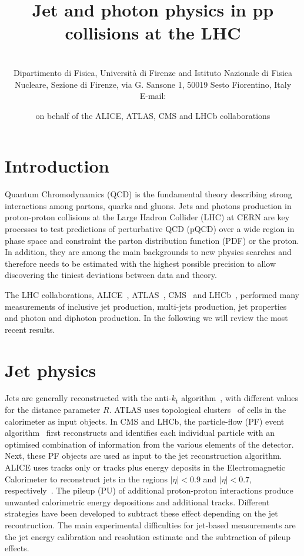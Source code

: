 \documentclass{PoS}
\title{Jet and photon physics in pp collisions at the LHC}
\author{\speaker{ Vitaliano Ciulli } %
\\ Dipartimento di Fisica, Universit\`a di Firenze and Istituto
Nazionale di Fisica Nucleare, Sezione di Firenze, via G. Sansone 1, 50019 Sesto Fiorentino, Italy \\ E-mail:
\email{vitaliano.ciulli@fi.infn.it}} \author{on behalf of the ALICE, ATLAS, CMS and LHCb collaborations}
\providecommand{\kts}{\ensuremath{k_{\mathrm{t}}}\xspace}
\begin{document}
\section{Introduction}

Quantum Chromodynamics (QCD) is the fundamental theory describing strong interactions among partons, \ie quarks and
gluons. Jets and photons production in proton-proton collisions at the Large Hadron Collider (LHC) at CERN are key processes to test predictions of
perturbative QCD (pQCD) over a wide region in phase space and constraint the parton distribution function (PDF) or the
proton. In addition, they are among the main backgrounds to new physics searches and therefore needs to be estimated with the
highest possible precision to allow discovering the tiniest deviations between data and theory.

The LHC collaborations, ALICE~\cite{Aamodt:2008zz}, ATLAS~\cite{Aad:2008zzm}, CMS~\cite{Chatrchyan:2008aa} and LHCb~\cite{Alves:2008zz}, performed many
measurements of inclusive jet production, multi-jets production, jet properties and photon and diphoton production. 
In the following we will review the most recent results.

\section{Jet physics}

Jets are generally reconstructed with the anti-\kts algorithm~\cite{Cacciari:2008gp}, with different values for the distance parameter $R$.
ATLAS uses topological clusters~\cite{Lampl:2008zz} of cells in the calorimeter as input objects. 
In CMS and LHCb, the particle-flow (PF) event
algorithm~\cite{CMS:2009nxa,Aaij:2013nxa} first reconstructs and identifies each individual particle with an optimised
combination of information from the various elements of the detector. Next, these PF objects are used as input to the jet
reconstruction algorithm. ALICE uses tracks only or tracks plus energy deposits
in the Electromagnetic Calorimeter to reconstruct jets in the regions
$|\eta|<0.9$ and $|\eta|<0.7$, respectively~\cite{Abelev:2013fn}.
The pileup (PU) of additional proton-proton interactions produce unwanted calorimetric energy depositions and additional
tracks. Different strategies have been developed to subtract these effect depending on the jet recontruction.
The main experimental difficulties for jet-based measurements are the jet energy calibration and resolution estimate and the subtraction of pileup
effects. 
\end{document}
